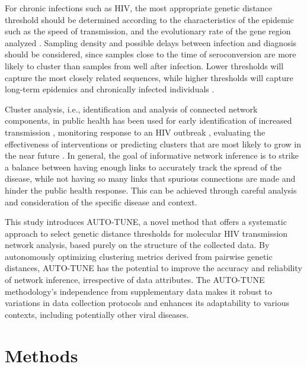 \documentclass[utf8]{FrontiersinHarvard} %
\begin{document}
For chronic infections such as HIV, the most appropriate genetic distance
threshold should be determined according to the characteristics of the epidemic
such as the speed of transmission, and the evolutionary rate of the gene region
analyzed \citep{liu_dynamics_2020}. Sampling density and possible delays between
infection and diagnosis should be considered, since samples close to the time
of seroconversion are more likely to cluster than samples from well after
infection. Lower thresholds will capture the most closely related sequences,
while higher thresholds will capture long-term epidemics and chronically
infected individuals \citep{junqueira_factors_2019}.

Cluster analysis, i.e., identification and analysis of connected network
components, in public health has been used for early identification of
increased transmission \citep{oster_hiv_2021, oster_identifying_2018},
monitoring response to an HIV outbreak \citep{tumpney_human_2020,
	sizemore_using_2020, tookes_rapid_2020}, evaluating the effectiveness of
interventions \citep{peters_hiv_2016,wang_targeting_2015,liu_dynamics_2020} or
predicting clusters that are most likely to grow in the near future
\citep{erly_predictive_2021,ragonnet-cronin_forecasting_2022}. In general, the goal of informative network inference is to strike a balance
between having enough links to accurately track the spread of the disease,
while not having so many links that spurious connections are made and hinder
the public health response. This can be achieved through careful analysis and
consideration of the specific disease and context.

This study introduces AUTO-TUNE, a novel method that offers a systematic
approach to select genetic distance thresholds for molecular HIV transmission
network analysis, based purely on the structure of the collected data. By autonomously optimizing clustering metrics derived from
pairwise genetic distances, AUTO-TUNE has the potential to improve the accuracy
and reliability of network inference, irrespective of data
attributes. The AUTO-TUNE methodology's independence from supplementary data
makes it robust to variations in data collection protocols and enhances its
adaptability to various contexts, including potentially other viral diseases.

\section{Methods}
\end{document}
